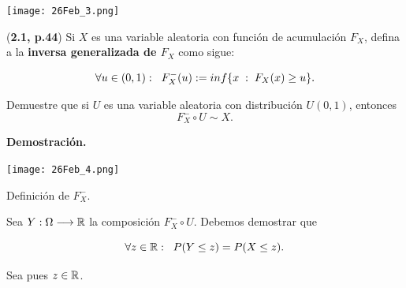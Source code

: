 \begin{center}
\begin{marginfigure}
  \centering
  \texttt{[image: 26Feb\_3.png]}
\end{marginfigure}
\end{center}
\begin{ejercicio}
\label{ejerc: 2.1}
(\textbf{2.1, p.44})
Si $X$ es una variable aleatoria con función de
acumulación $F_{X}$, defina a la \textbf{inversa generalizada
de $F_{X}$} como sigue:

\begin{equation}
\label{ec: def inversa generalizada}
\forall u \in (0,1): \hspace*{0.2cm}
F_{X}^{-}(u):= inf\{x \hspace{0.1cm} : \hspace*{0.1cm} F_{X}(x) \geq u \}.
\end{equation}

Demuestre que si $U$ es una variable aleatoria con
distribución $U(0,1)$, entonces 
\[
F_{X}^{-} \circ U \sim X.
\]
\end{ejercicio}
\noindent
\textbf{Demostración.}

\begin{center}
\begin{marginfigure}
  \centering
  \texttt{[image: 26Feb\_4.png]}
  \caption{Definición de $F^{-}_{X}$.}
\end{marginfigure}
\end{center}


Sea $Y: \Omega \longrightarrow \mathbb{R}$ la composición
$F^{-}_{X} \circ U$. Debemos demostrar que

\begin{equation*}
\forall z \in \mathbb{R}: \hspace*{0.2cm}
P(Y \leq z) = P(X \leq z).
\end{equation*}


Sea pues $z \in \mathbb{R}$.

